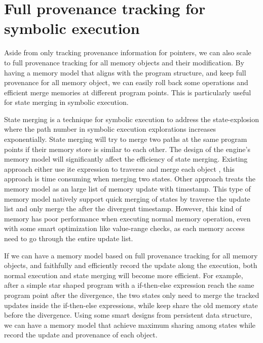\documentclass[sigplan, nonacm]{acmart}\settopmatter{printfolios=true,printccs=false,printacmref=false}
\begin{document}
\section{Full provenance tracking for symbolic execution}\label{fullprovenance}
Aside from only tracking provenance information for pointers, we can also scale to full provenance tracking for all memory objects and their modification. By having a memory model that aligns with the program structure, and keep full provenance for all memory object, we can easily roll back some operations and efficient merge memories at different program points. This is particularly useful for state merging in symbolic execution.\par
State merging is a technique for symbolic execution to address the state-explosion where the path number in symbolic execution explorations increases exponentially. State merging will try to merge two paths at the same program points if their memory store is similar to each other. The design of the engine's memory model will significantly affect the efficiency of state merging. Existing approach either use ite expression to traverse and merge each object \cite{kuznetsov2012efficient}, this approach is time consuming when merging two states. Other approach \cite{coppa2017rethinking} treats the memory model as an large list of memory update with timestamp. This type of memory model natively support quick merging of states by traverse the update list and only merge the after the divergent timestamp. However, this kind of memory has poor performance when executing normal memory operation, even with some smart optimization like value-range checks, as each memory access need to go through the entire update list.\par
If we can have a memory model based on full provenance tracking for all memory objects, and faithfully and efficiently record the update along the execution, both normal execution and state merging will become more efficient. For example, after a simple star shaped program with a if-then-else expression reach the same program point after the divergence, the two states only need to merge the tracked updates inside the if-then-else expressions, while keep share the old memory state before the divergence. Using some smart designs from persistent data structure, we can have a memory model that achieve maximum sharing among states while record the update and provenance of each object. %
\end{document}
